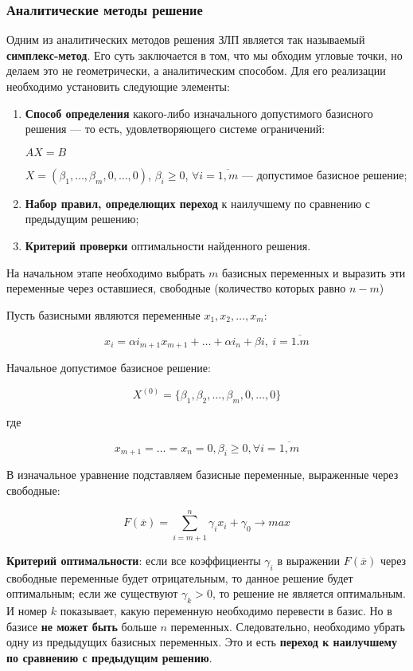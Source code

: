 \documentclass{article}
\begin{document}
\subsubsection{Аналитические методы решение}

Одним из аналитических методов решения ЗЛП является так называемый \textbf{симплекс-метод}. Его суть заключается в том, что мы обходим угловые точки, но делаем это не геометрически, а аналитическим способом. Для его реализации необходимо установить следующие элементы:

\begin{enumerate}
    \item \textbf{Способ определения} какого-либо изначального допустимого базисного решения — то есть, удовлетворяющего системе ограничений:
    
    $AX = B$

    $X = (\beta_1, \dots, \beta_m, 0, \dots, 0)$, $\beta_{i} \ge 0$, $\forall i = \overline{1, m}$ — допустимое базисное решение;
    \item \textbf{Набор правил, определющих переход} к наилучшему по сравнению с предыдущим решению;
    \item \textbf{Критерий проверки} оптимальности найденного решения.
\end{enumerate}

На начальном этапе необходимо выбрать $m$ базисных переменных и выразить эти переменные через оставшиеся, свободные (количество которых равно $n - m$)

Пусть базисными являются переменные $x_1, x_2, \dots, x_{m}$:

$$
x_{i} = \alpha i_{m + 1} x_{m + 1} + \dots + \alpha i_{n} + \beta i, \ i = \overline{1. m}
$$

Начальное допустимое базисное решение:

$$
X^{(0)} = \{ \beta_1, \beta_2, \dots, \beta_m, 0, \dots, 0 \}
$$

где 

$$x_{m + 1} = \dots = x_{n} = 0, \beta_{i} \ge 0, \forall i = \overline{1, m}$$

В изначальное уравнение подставляем базисные переменные, выраженные через свободные:

$$
F(\overline{x}) = \sum\limits_{i = m + 1}^{n} \gamma_{i} x_i + \gamma_0 \to max
$$

\textbf{Критерий оптимальности}: если все коэффициенты $\gamma_{i}$ в выражении $F(\overline{x})$ через свободные переменные будет отрицательным, то данное решение будет оптимальным; если же существуют $\gamma_{k} > 0$, то решение не является оптимальным. И номер $k$ показывает, какую переменную необходимо перевести в базис. Но в базисе \textbf{не может быть} больше $n$ переменных. Следовательно, необходимо убрать одну из предыдущих базисных переменных. Это и есть \textbf{переход к наилучшему по сравнению с предыдущим решению}.
\end{document}
